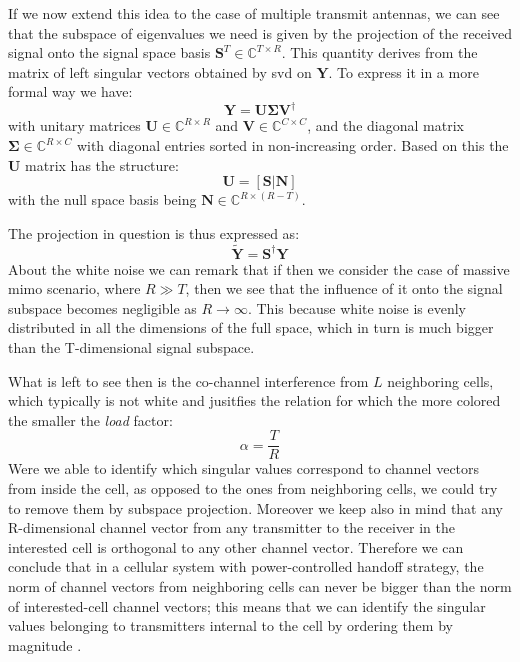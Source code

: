\documentclass[11pt]{book}
\begin{document}
If we now extend this idea to the case of multiple transmit antennas, we can see that the subspace of eigenvalues we need is given by the projection of the received signal onto the signal space basis $\mathbf{S}^T \in \mathbb{C}^{T\times R}$. This quantity derives from the matrix of left singular vectors obtained by \gls{svd} on $\mathbf{Y}$. To express it in a more formal way we have:
\begin{equation}
  \mathbf{Y} = \mathbf{U} \mathbf{\Sigma} \mathbf{V}^{\dagger}
\end{equation}
with unitary matrices $\mathbf{U} \in \mathbb{C}^{R\times R}$ and $\mathbf{V} \in \mathbb{C}^{C\times C}$, and the diagonal matrix $\mathbf{\Sigma} \in \mathbb{C}^{R\times C}$ with diagonal entries sorted in non-increasing order. Based on this the $\mathbf{U}$ matrix has the structure:
\begin{equation}
  \mathbf{U} = [\mathbf{S|\mathbf{N}}]
\end{equation}
with the null space basis being $\mathbf{N} \in \mathbb{C}^{R\times (R-T)}$.

The projection in question is thus expressed as:
\begin{equation}
  \mathbf{\tilde{Y}} = \mathbf{S}^{\dagger}\mathbf{Y}
\end{equation}
About the white noise we can remark that if then we consider the case of massive \gls{mimo} scenario, where $R \gg T$, then we see that the influence of it onto the signal subspace becomes negligible as $R \rightarrow \infty$. This because white noise is evenly distributed in all the dimensions of the full space, which in turn is much bigger than the T-dimensional signal subspace.

What is left to see then is the co-channel interference from $L$ neighboring cells, which typically is not white and jusitfies the relation for which the more colored the smaller the \textit{load} factor:
\begin{equation}
  \alpha = \frac{T}{R}
\end{equation}
Were we able to identify which singular values correspond to channel vectors from inside the cell, as opposed to the ones from neighboring cells, we could try to remove them by subspace projection. Moreover we keep also in mind that any R-dimensional channel vector from any transmitter to the receiver in the interested cell is orthogonal to any other channel vector. Therefore we can conclude that in a cellular system with power-controlled handoff strategy, the norm of channel vectors from neighboring cells can never be bigger than the norm of interested-cell channel vectors; this means that we can identify the singular values belonging to transmitters internal to the cell by ordering them by magnitude \cite{Ralf}.
\end{document}
